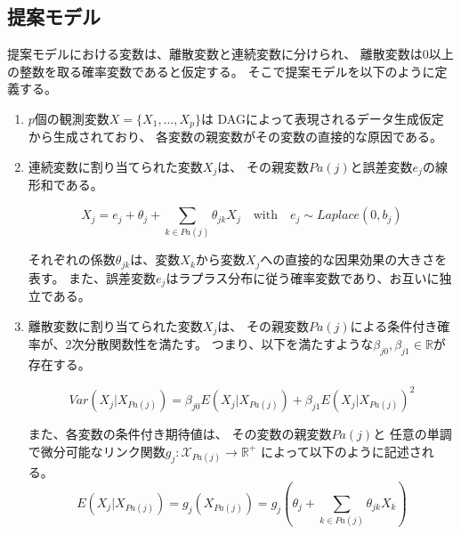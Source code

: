 
\subsection{提案モデル}

提案モデルにおける変数は、離散変数と連続変数に分けられ、
離散変数は0以上の整数を取る確率変数であると仮定する。
そこで提案モデルを以下のように定義する。

\begin{enumerate}
  \item
  $p$個の観測変数$X = \{ X_1, \dots, X_p \}$は
  DAGによって表現されるデータ生成仮定から生成されており、
  各変数の親変数がその変数の直接的な原因である。

  \item
  連続変数に割り当てられた変数$X_j$は、
  その親変数$Pa(j)$と誤差変数$e_j$の線形和である。

  \begin{equation}
    X_j = e_j + \theta_{j} + \sum_{k \in Pa(j)} \theta_{jk}X_j
    \quad \text{with} \quad e_j \sim \mathit{Laplace}(0, b_j)
    \label{eq:lingam_prop}
  \end{equation}

  それぞれの係数$\theta_{jk}$は、変数$X_k$から変数$X_j$への直接的な因果効果の大きさを表す。
  また、誤差変数$e_j$はラプラス分布に従う確率変数であり、お互いに独立である。

  \item
  離散変数に割り当てられた変数$X_j$は、
  その親変数$Pa(j)$による条件付き確率が、2次分散関数性を満たす。
  つまり、以下を満たすような$\beta_{j0},\beta_{j1} \in \mathbb{R}$が存在する。

  \begin{equation}
    \mathit{Var}(X_j|X_{Pa(j)}) = \beta_{j0} E(X_j | X_{Pa(j)}) + \beta_{j1} E(X_j | X_{Pa(j)})^2
    \label{QVF_prop}
  \end{equation}

  また、各変数の条件付き期待値は、
  その変数の親変数$Pa(j)$と
  任意の単調で微分可能なリンク関数$g_j \colon \mathcal X_{Pa(j)} \rightarrow \mathbb R^+$
  によって以下のように記述される。
  \begin{equation}
    E(X_j | X_{Pa(j)})
    = g_j(X_{Pa(j)})
    = g_j \left(\theta_j + \sum_{k \in Pa(j)} \theta_{jk}X_k \right)
  \end{equation}
\end{enumerate}
